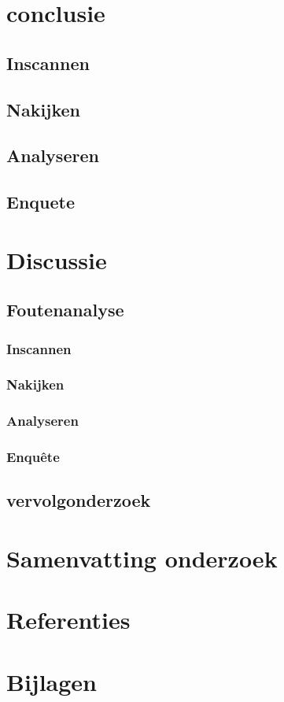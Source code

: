 \documentclass[12pt]{article}
\begin{document}
\section{conclusie}
\subsection{Inscannen}

\subsection{Nakijken}

\subsection{Analyseren}

\subsection{Enquete}


\section{Discussie}
\subsection{Foutenanalyse}
\subsubsection{Inscannen}

\subsubsection{Nakijken}

\subsubsection{Analyseren}

\subsubsection{Enquête}



\subsection{vervolgonderzoek}
\section{Samenvatting onderzoek}

\section{Referenties}
\section{Bijlagen}
\end{document}
